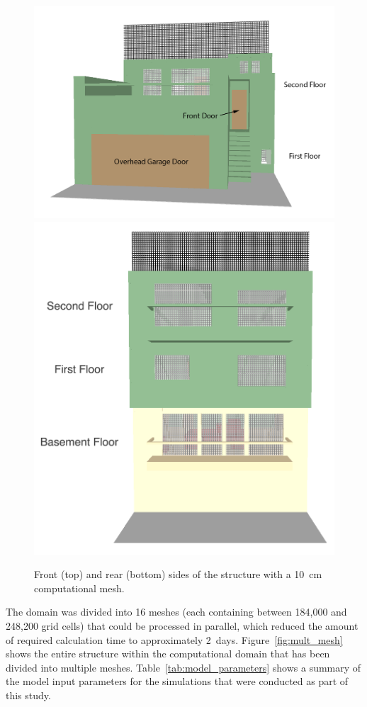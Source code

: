 \documentclass[12pt,oneside]{book}
\begin{document}
\begin{figure}[!ht]
\includegraphics[width=5.0in]{../Figures/SMV_Exterior_Grid_Front} \\
\includegraphics[width=4.5in]{../Figures/SMV_Exterior_Grid_Rear}
\caption[Front and rear of the structure with a 10~cm computational mesh.]
{Front (top) and rear (bottom) sides of the structure with a 10~cm computational mesh.}
\label{fig:SMV_exterior_grid}
\end{figure}


\clearpage


The domain was divided into 16 meshes (each containing between 184,000 and 248,200 grid cells) that could be processed in parallel, which reduced the amount of required calculation time to approximately 2~days. Figure~\ref{fig:mult_mesh} shows the entire structure within the computational domain that has been divided into multiple meshes. Table~\ref{tab:model_parameters} shows a summary of the model input parameters for the simulations that were conducted as part of this study.
\end{document}
